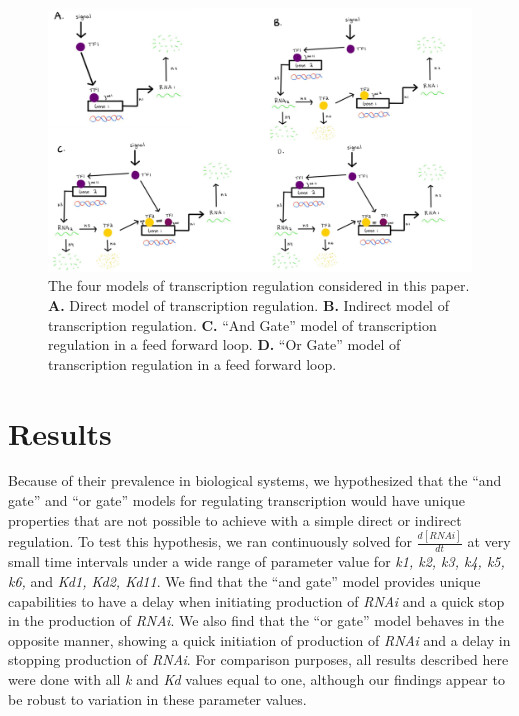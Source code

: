 \documentclass{article}
\begin{document}
\pagebreak

\begin{figure}[h]
    \centering
    \includegraphics[width=1\textwidth]{figure1.png}
    \caption{\textit{\label{fig:figure1}}The four models of transcription regulation considered in this paper. \textbf{A.} Direct model of transcription regulation. \textbf{B.} Indirect model of transcription regulation. \textbf{C.} ``And Gate'' model of transcription regulation in a feed forward loop. \textbf{D.} ``Or Gate'' model of transcription regulation in a feed forward loop.}
\end{figure}



\section{Results}

Because of their prevalence in biological systems, we hypothesized that the ``and gate'' and ``or gate'' models for regulating transcription would have unique properties that are not possible to achieve with a simple direct or indirect regulation. To test this hypothesis, we ran continuously solved for \(\frac{d[RNAi]}{dt}\) at very small time intervals under a wide range of parameter value for \textit{k1, k2, k3, k4, k5, k6,} and \textit{Kd1, Kd2, Kd11}. We find that the ``and gate'' model provides unique capabilities to have a delay when initiating production of \textit{RNAi} and a quick stop in the production of \textit{RNAi}. We also find that the ``or gate'' model behaves in the opposite manner, showing a quick initiation of production of \textit{RNAi} and a delay in stopping production of \textit{RNAi}. For comparison purposes, all results described here were done with all \textit{k} and \textit{Kd} values equal to one, although our findings appear to be robust to variation in these parameter values. 
\end{document}
